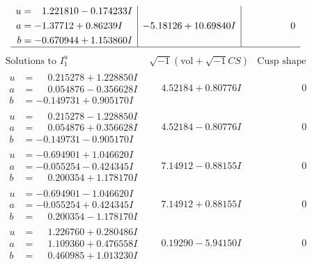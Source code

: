 \documentclass[1p]{elsarticle_modified}
\theoremstyle{definition}
\newcommand{\I}{\sqrt{-1}}
\begin{document}
$$\begin{array}{c|c|c}
\begin{aligned}
u &= \phantom{-}1.221810 - 0.174233 I \\
a &= -1.37712 + 0.86239 I \\
b &= -0.670944 + 1.153860 I\end{aligned}
 & -5.18126 + 10.69840 I & \phantom{-0.000000 } 0\\
 \hline 
 \end{array}$$\newpage$$\begin{array}{c|c|c}  
\text{Solutions to }I^u_{1}& \I (\text{vol} + \sqrt{-1}CS) & \text{Cusp shape}\\
 \hline 
\begin{aligned}
u &= \phantom{-}0.215278 + 1.228850 I \\
a &= \phantom{-}0.054876 - 0.356628 I \\
b &= -0.149731 + 0.905170 I\end{aligned}
 & \phantom{-}4.52184 + 0.80776 I & \phantom{-0.000000 } 0 \\ \hline\begin{aligned}
u &= \phantom{-}0.215278 - 1.228850 I \\
a &= \phantom{-}0.054876 + 0.356628 I \\
b &= -0.149731 - 0.905170 I\end{aligned}
 & \phantom{-}4.52184 - 0.80776 I & \phantom{-0.000000 } 0 \\ \hline\begin{aligned}
u &= -0.694901 + 1.046620 I \\
a &= -0.055254 - 0.424345 I \\
b &= \phantom{-}0.200354 + 1.178170 I\end{aligned}
 & \phantom{-}7.14912 - 0.88155 I & \phantom{-0.000000 } 0 \\ \hline\begin{aligned}
u &= -0.694901 - 1.046620 I \\
a &= -0.055254 + 0.424345 I \\
b &= \phantom{-}0.200354 - 1.178170 I\end{aligned}
 & \phantom{-}7.14912 + 0.88155 I & \phantom{-0.000000 } 0 \\ \hline\begin{aligned}
u &= \phantom{-}1.226760 + 0.280486 I \\
a &= \phantom{-}1.109360 + 0.476558 I \\
b &= \phantom{-}0.460985 + 1.013230 I\end{aligned}
 & \phantom{-}0.19290 - 5.94150 I & \phantom{-0.000000 } 0 \\ \hline\begin{aligned}

\end{aligned}
\end{array}$$
\end{document}
